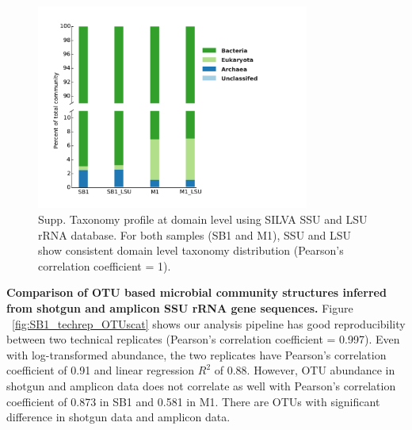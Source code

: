 \documentclass[12pt]{article}
\begin{document}
\begin{figure}[tbph!]
  \centering
  \includegraphics[width=0.8\textwidth]{figs/LSU_domain_taxa}
  \caption[Taxonomy profile at domain level using SILVA SSU and LSU rRNA database]{Supp. Taxonomy profile at domain level using SILVA SSU and LSU rRNA database. For both samples (SB1 and M1), SSU and LSU show consistent domain level taxonomy distribution (Pearson’s correlation coefficient = 1).}
  \label{fig:LSU_domain_taxa}
\end{figure}


  {\bf Comparison of OTU based microbial community structures inferred from shotgun and amplicon SSU rRNA gene sequences. }
  Figure ~\ref{fig:SB1_techrep_OTUscat} shows our analysis pipeline has good reproducibility between two technical replicates (Pearson’s correlation coefficient = 0.997). Even with log-transformed abundance, the two replicates have Pearson’s correlation coefficient of 0.91 and linear regression $R^2$ of 0.88. However, OTU abundance in shotgun and amplicon data does not correlate as well with Pearson’s correlation coefficient of 0.873 in SB1 and 0.581 in M1. There are OTUs with significant difference in shotgun data and amplicon data.
\end{document}

